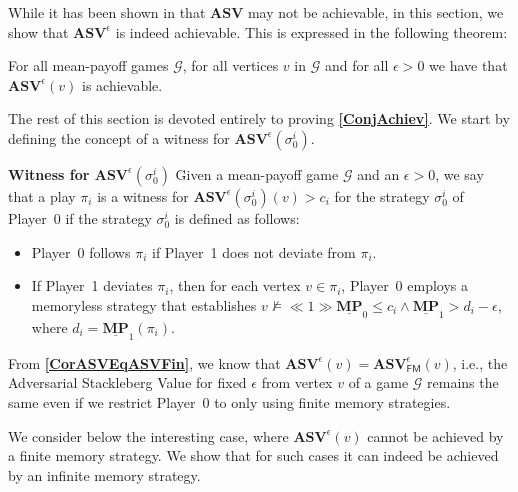 While it has been shown in \cite{FGR20} that \textbf{$\mathbf{ASV}$} may not be achievable, in this section, we show that $\mathbf{ASV}^{\epsilon}$ is indeed achievable. This is expressed in the following theorem:
\begin{theorem}
    \label{ConjAchiev}
    For all mean-payoff games $\mathcal{G}$, for all vertices $v$ in $\mathcal{G}$ and for all $\epsilon > 0$ we have that $\mathbf{ASV}^{\epsilon}(v)$ is achievable.
\end{theorem}

The rest of this section is devoted entirely to proving \textbf{\cref{ConjAchiev}}. We start by defining the concept of a witness for $\mathbf{ASV}^{\epsilon}(\sigma_0^i)$.

\textbf{Witness for $\mathbf{ASV}^{\epsilon}(\sigma_0^i)$}
Given a mean-payoff game $\mathcal{G}$ and an $\epsilon > 0$, we say that a play $\pi_i$ is a witness for $\mathbf{ASV}^{\epsilon}(\sigma_0^i)(v) > c_i$ for the strategy $\sigma_0^i$ of Player~0 if the strategy $\sigma_0^i$ is defined as follows:
\begin{itemize}
    \item Player~0 follows $\pi_i$ if Player~1 does not deviate from $\pi_i$.
    \item If Player~1 deviates $\pi_i$, then for each vertex $v \in \pi_i$, Player~0 employs a memoryless strategy that establishes $v \nvDash \ll 1 \gg \underline{\mathbf{MP}}_0 \leqslant c_i \land \underline{\mathbf{MP}}_1 > d_i - \epsilon$, where $d_i = \underline{\mathbf{MP}}_1(\pi_i)$.
\end{itemize}

From \textbf{\cref{CorASVEqASVFin}}, we know that $\mathbf{ASV}^{\epsilon}(v) = \mathbf{ASV}^{\epsilon}_{\mathsf{FM}}(v)$, i.e., the Adversarial Stackleberg Value for fixed $\epsilon$ from vertex $v$ of a game $\mathcal{G}$ remains the same even if we restrict Player~0 to only using finite memory strategies.


We consider below the interesting case, where $\mathbf{ASV}^{\epsilon}(v)$ cannot be achieved by a finite memory strategy.
We show that for such cases it can indeed be achieved by an infinite memory strategy.
 
